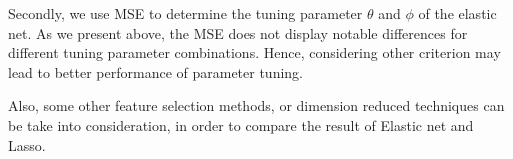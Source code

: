 Secondly, we use MSE to determine the tuning parameter $\theta$ and $\phi$ of the elastic net. 
As we present above, the MSE  does not display notable differences for different tuning parameter combinations.
Hence, considering other criterion may lead to better performance of parameter tuning.

Also, some other feature selection methods, or dimension reduced techniques can be take into consideration, in order to compare the result of Elastic net and Lasso.

